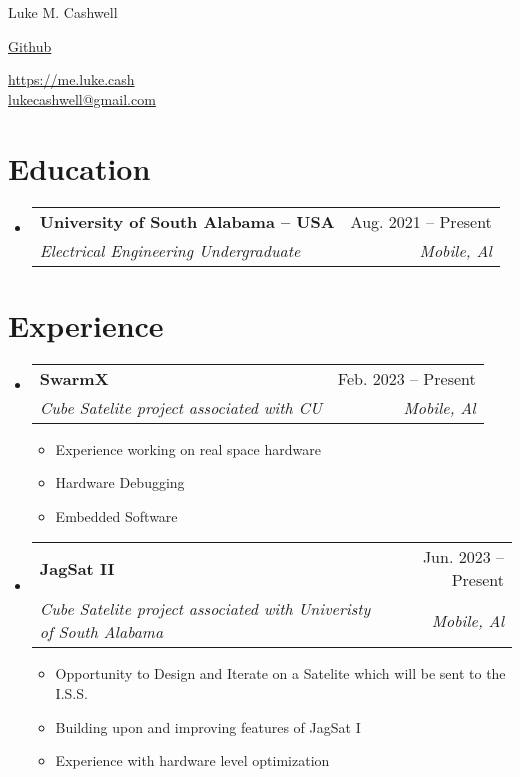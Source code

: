 \documentclass[letterpaper,10pt]{article}
\makeatletter
\newcommand{\resumeItem}[1]{
  \item\small{
    {#1 \vspace{-2pt}}
  }
}
\newcommand{\resumeSubheading}[4]{
  \vspace{-2pt}\item
    \begin{tabular*}{0.97\textwidth}[t]{l@{\extracolsep{\fill}}r}
      \textbf{#1} & #2 \\
      \textit{\small#3} & \textit{\small #4} \\
    \end{tabular*}\vspace{-7pt}
}
\newcommand{\resumeSubHeadingListStart}{\begin{itemize}[leftmargin=0.15in, label={}]}
\newcommand{\resumeSubHeadingListEnd}{\end{itemize}}
\newcommand{\resumeItemListStart}{\begin{itemize}}
\newcommand{\resumeItemListEnd}{\end{itemize}\vspace{-5pt}}
\makeatother
\begin{document}
\begin{center}
    {\LARGE Luke M. Cashwell} \\ \vspace{2pt}
    \begin{multicols}{2}
    \begin{flushleft}
    \href{{your github page link}}{Github}
    \end{flushleft}
    
    \begin{flushright}
    \href{{https://me.luke.cash}}{https://me.luke.cash}\\
    \href{mailto:{lukecashwell@gmail.com}}{lukecashwell@gmail.com}
    \end{flushright}
    \end{multicols}
\end{center}


\vspace{-2pt}
\section{Education}
  \resumeSubHeadingListStart
      \resumeSubheading
      {University of South Alabama -- USA}{Aug. 2021 -- Present}
      {Electrical Engineering Undergraduate}{Mobile, Al}

  \resumeSubHeadingListEnd


\section{Experience}
  \resumeSubHeadingListStart
    \resumeSubheading
      {SwarmX}{Feb. 2023 -- Present}
      {Cube Satelite project associated with CU}{Mobile, Al}
      \resumeItemListStart
        \resumeItem{Experience working on real space hardware}
        \resumeItem{Hardware Debugging}
        \resumeItem{Embedded Software}
    \resumeItemListEnd
    \resumeSubheading
      {JagSat II}{Jun. 2023 -- Present}
      {Cube Satelite project associated with Univeristy of South Alabama}{Mobile, Al}
      \resumeItemListStart
        \resumeItem{Opportunity to Design and Iterate on a Satelite which will be sent to the I.S.S.}
        \resumeItem{Building upon and improving features of JagSat I}
        \resumeItem{Experience with hardware level optimization}
    \resumeItemListEnd
  \resumeSubHeadingListEnd

\end{document}

